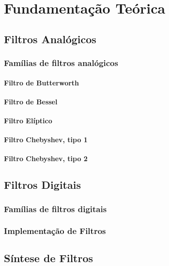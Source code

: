 \chapter{Fundamentação Teórica}

\section{Filtros Analógicos}

\subsection{Famílias de filtros analógicos}

\subsubsection{Filtro de Butterworth}

\subsubsection{Filtro de Bessel}

\subsubsection{Filtro Elíptico}

\subsubsection{Filtro Chebyshev, tipo 1}

\subsubsection{Filtro Chebyshev, tipo 2}

\section{Filtros Digitais}
\subsection{Famílias de filtros digitais}

\subsection{Implementação de Filtros}

\section{Síntese de Filtros}

